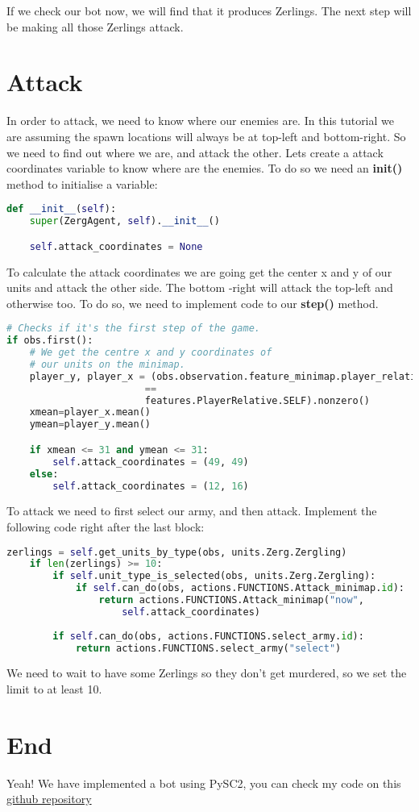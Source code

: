 \documentclass[11pt]{report}            %
\begin{document}
If we check our bot now, we will find that it produces Zerlings. The next step will be making all those Zerlings attack.

\chapter{Attack}
In order to attack, we need to know where our enemies are. In this tutorial we are assuming the spawn locations will always be at top-left and bottom-right. So we need to find out where we are, and attack the other.
Lets create a attack coordinates variable to know where are the enemies. To do so we need an \textbf{\textunderscore\textunderscore init\textunderscore\textunderscore ()} method to initialise a variable:
\begin{lstlisting}[language=Python]
def __init__(self):
    super(ZergAgent, self).__init__()

    self.attack_coordinates = None
\end{lstlisting}
To calculate the attack coordinates we are going get the center x and y of our units and attack the other side. The bottom -right will attack the top-left and otherwise too. To do so, we need to implement code to our \textbf{step()} method.
\begin{lstlisting}[language=Python]
# Checks if it's the first step of the game.
if obs.first():
    # We get the centre x and y coordinates of 
    # our units on the minimap.
    player_y, player_x = (obs.observation.feature_minimap.player_relative
                        ==
                        features.PlayerRelative.SELF).nonzero()
    xmean=player_x.mean()
    ymean=player_y.mean()

    if xmean <= 31 and ymean <= 31:
        self.attack_coordinates = (49, 49)
    else:
        self.attack_coordinates = (12, 16)
\end{lstlisting}
To attack we need to first select our army, and then attack. Implement the following code right after the last block:
\begin{lstlisting}[language=Python]
zerlings = self.get_units_by_type(obs, units.Zerg.Zergling)
    if len(zerlings) >= 10:
        if self.unit_type_is_selected(obs, units.Zerg.Zergling):
            if self.can_do(obs, actions.FUNCTIONS.Attack_minimap.id):
                return actions.FUNCTIONS.Attack_minimap("now",
                    self.attack_coordinates)
        
        if self.can_do(obs, actions.FUNCTIONS.select_army.id):
            return actions.FUNCTIONS.select_army("select")
\end{lstlisting}
We need to wait to have some Zerlings so they don't get murdered, so we set the limit to at least 10.

\chapter{End}
Yeah! We have implemented a bot using PySC2, you can check my code on this \href{https://github.com/miguelxngx/MachineLearning-IA/blob/master/IA/Primer%20Proyecto/Zerg.py}{github repository}
\end{document}
